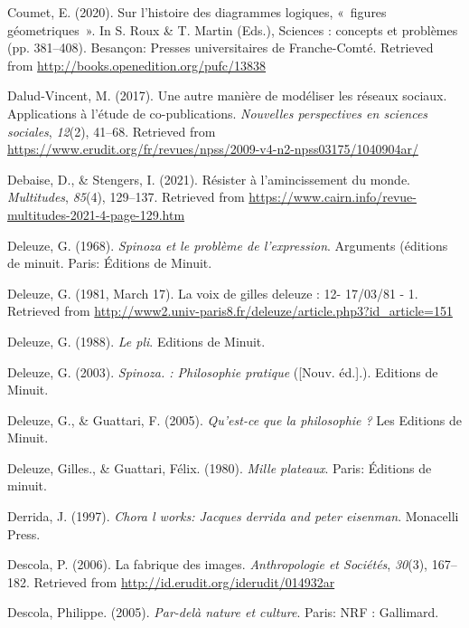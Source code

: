 \documentclass[
  a4paper,
  DIV=11,
  numbers=noendperiod]{scrreprt}
\newlength{\cslhangindent}
\newenvironment{CSLReferences}[2] %
 {\begin{list}{}{%
  \setlength{\itemindent}{0pt}
  \setlength{\leftmargin}{0pt}
  \setlength{\parsep}{0pt}
  \ifodd #1
   \setlength{\leftmargin}{\cslhangindent}
   \setlength{\itemindent}{-1\cslhangindent}
  \fi
  \setlength{\itemsep}{#2\baselineskip}}}
 {\end{list}}
\begin{document}
\begin{CSLReferences}{1}{0}
Coumet, E. (2020). Sur l{'}histoire des diagrammes logiques, «~figures
géometriques~». In S. Roux \& T. Martin (Eds.), Sciences : concepts et
problèmes (pp. 381--408). Besançon: Presses universitaires de
Franche-Comté. Retrieved from
\url{http://books.openedition.org/pufc/13838}

Dalud-Vincent, M. (2017). Une autre manière de modéliser les réseaux
sociaux. Applications à l{'}étude de co-publications. \emph{Nouvelles
perspectives en sciences sociales}, \emph{12}(2), 41--68. Retrieved from
\url{https://www.erudit.org/fr/revues/npss/2009-v4-n2-npss03175/1040904ar/}

Debaise, D., \& Stengers, I. (2021). Résister à l{'}amincissement du
monde. \emph{Multitudes}, \emph{85}(4), 129--137. Retrieved from
\url{https://www.cairn.info/revue-multitudes-2021-4-page-129.htm}

Deleuze, G. (1968). \emph{Spinoza et le problème de l'expression}.
Arguments (éditions de minuit. Paris: Éditions de Minuit.

Deleuze, G. (1981, March 17). La voix de gilles deleuze : 12- 17/03/81 -
1. Retrieved from
\url{http://www2.univ-paris8.fr/deleuze/article.php3?id_article=151}

Deleuze, G. (1988). \emph{Le pli}. Editions de Minuit.

Deleuze, G. (2003). \emph{Spinoza. : Philosophie pratique} ({[}Nouv.
éd.{]}.). Editions de Minuit.

Deleuze, G., \& Guattari, F. (2005). \emph{Qu'est-ce que la philosophie
?} Les Editions de Minuit.

Deleuze, Gilles., \& Guattari, Félix. (1980). \emph{Mille plateaux}.
Paris: Éditions de minuit.

Derrida, J. (1997). \emph{Chora l works: Jacques derrida and peter
eisenman}. Monacelli Press.

Descola, P. (2006). La fabrique des images. \emph{Anthropologie et
Sociétés}, \emph{30}(3), 167--182. Retrieved from
\url{http://id.erudit.org/iderudit/014932ar}

Descola, Philippe. (2005). \emph{Par-delà nature et culture}. Paris: NRF
: Gallimard.


\end{CSLReferences}
\end{document}
